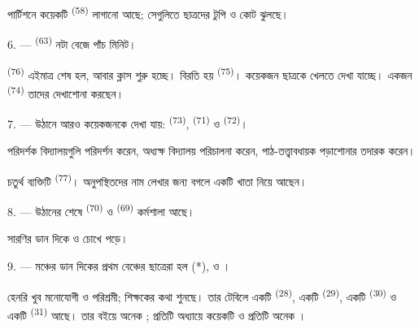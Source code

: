পার্টিশনে কয়েকটি  \textsuperscript{(58)} লাগানো আছে; সেগুলিতে
ছাত্রদের টুপি ও কোট ঝুলছে।

\VUsaut{5.2mm}
\VUsaut{3.6mm}

6. ---  \textsuperscript{(63)} নটা বেজে পাঁচ মিনিট।

 \textsuperscript{(76)} এইমাত্র শেষ হল, আবার ক্লাস শুরু হচ্ছে।
বিরতি হয়  \textsuperscript{(75)}। কয়েকজন ছাত্রকে খেলতে দেখা
যাচ্ছে। একজন  \textsuperscript{(74)} তাদের দেখাশোনা করছেন।

7. --- উঠানে আরও কয়েকজনকে দেখা যায়: 
\textsuperscript{(73)},  \textsuperscript{(71)} ও 
\textsuperscript{(72)}।

পরিদর্শক বিদ্যালয়গুলি পরিদর্শন করেন, অধ্যক্ষ বিদ্যালয় পরিচালনা করেন,
পাঠ-তত্ত্বাবধায়ক পড়াশোনার তদারক করেন।

চতুর্থ ব্যক্তিটি  \textsuperscript{(77)}। অনুপস্থিতদের নাম
লেখার জন্য বগলে একটি খাতা নিয়ে আছেন।

8. --- উঠানের শেষে  \textsuperscript{(70)} ও
 \textsuperscript{(69)} কর্মশালা আছে।

সারণির ডান দিকে  ও   চোখে
পড়ে।


\VUsaut{2.4mm}

\VUsaut{3.0mm}

9. --- মঞ্চের ডান দিকের প্রথম বেঞ্চের ছাত্রেরা হল  (*),
 ও ।

হেনরি খুব মনোযোগী ও পরিশ্রমী; শিক্ষকের কথা শুনছে। তার টেবিলে একটি
 \textsuperscript{(28)}, একটি  \textsuperscript{(29)}, একটি
 \textsuperscript{(30)} ও একটি 
\textsuperscript{(31)} আছে। তার বইয়ে অনেক ; প্রতিটি অধ্যায়ে
কয়েকটি  ও প্রতিটি  অনেক
।

